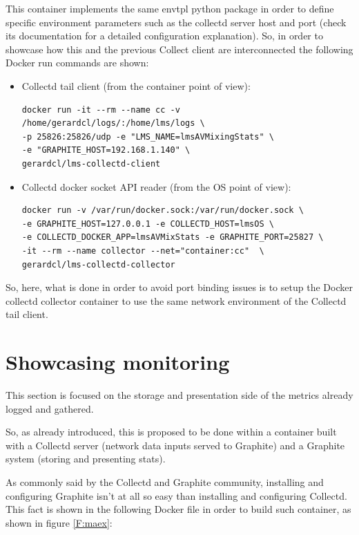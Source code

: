 This container implements the same envtpl python package in order to define specific environment parameters such as the collectd server host and port (check its documentation for a detailed configuration explanation). So, in order to showcase how this and the previous Collect client are interconnected the following Docker run commands are shown:

\begin{itemize}
\item Collectd tail client (from the container point of view):
\begin{verbatim}
docker run -it --rm --name cc -v /home/gerardcl/logs/:/home/lms/logs \
-p 25826:25826/udp -e "LMS_NAME=lmsAVMixingStats" \
-e "GRAPHITE_HOST=192.168.1.140" \
gerardcl/lms-collectd-client
\end{verbatim}
\item Collectd docker socket API reader (from the OS point of view):
\begin{verbatim}
docker run -v /var/run/docker.sock:/var/run/docker.sock \
-e GRAPHITE_HOST=127.0.0.1 -e COLLECTD_HOST=lmsOS \
-e COLLECTD_DOCKER_APP=lmsAVMixStats -e GRAPHITE_PORT=25827 \
-it --rm --name collector --net="container:cc"  \
gerardcl/lms-collectd-collector
\end{verbatim}
\end{itemize}

So, here, what is done in order to avoid port binding issues is to setup the Docker collectd collector container to use the same network environment of the Collectd tail client.

\section{Showcasing monitoring}

This section is focused on the storage and presentation side of the metrics already logged and gathered.

So, as already introduced, this is proposed to be done within a container built with a Collectd server (network data inputs served to Graphite) and a Graphite system (storing and presenting stats).

As commonly said by the Collectd and Graphite community, installing and configuring Graphite isn't at all so easy than installing and configuring Collectd. This fact is shown in the following Docker file in order to build such container, as shown in figure \ref{F:maex}:

